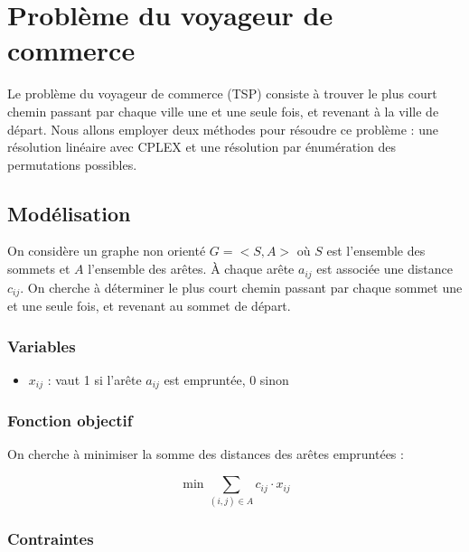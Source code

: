 \chapter{Problème du voyageur de commerce}
\label{chap:tsp}

Le problème du voyageur de commerce (TSP) consiste à trouver le plus court chemin passant par chaque ville une et une seule fois, et revenant à la ville de départ. Nous allons employer deux méthodes pour résoudre ce problème : une résolution linéaire avec CPLEX \cite{wiki_tsp} et une résolution par énumération des permutations possibles.

\section{Modélisation}
\label{sec:tsp_model}
On considère un graphe non orienté $G=<S,A>$ où $S$ est l'ensemble des sommets et $A$ l'ensemble des arêtes. À chaque arête $a_{ij}$ est associée une distance $c_{ij}$. On cherche à déterminer le plus court chemin passant par chaque sommet une et une seule fois, et revenant au sommet de départ.

\subsection{Variables}

\begin{itemize}
    \item $x_{ij}$ : vaut 1 si l'arête $a_{ij}$ est empruntée, 0 sinon
\end{itemize}

\subsection{Fonction objectif}

On cherche à minimiser la somme des distances des arêtes empruntées :

\begin{equation}
    \min \sum_{(i,j) \in A} c_{ij} \cdot x_{ij}
\end{equation}

\subsection{Contraintes}


